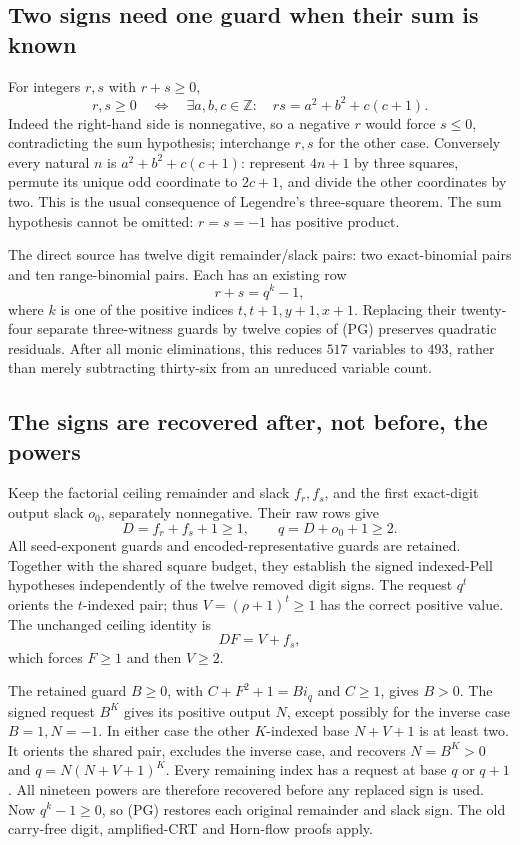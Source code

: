 \subsection{Two signs need one guard when their sum is known}
For integers $r,s$ with $r+s\ge0$,
\[
 r,s\ge0\quad\Longleftrightarrow\quad
 \exists a,b,c\in\mathbb Z:\quad rs=a^2+b^2+c(c+1).       \tag{PG}
\]
Indeed the right-hand side is nonnegative, so a negative $r$ would force
$s\le0$, contradicting the sum hypothesis; interchange $r,s$ for the
other case. Conversely every natural $n$ is $a^2+b^2+c(c+1)$: represent
$4n+1$ by three squares, permute its unique odd coordinate to $2c+1$,
and divide the other coordinates by two. This is the usual consequence
of Legendre's three-square theorem. The sum hypothesis cannot be omitted:
$r=s=-1$ has positive product.

The direct source has twelve digit remainder/slack pairs: two exact-binomial
pairs and ten range-binomial pairs. Each has an existing row
\[
 r+s=q^k-1,
\]
where $k$ is one of the positive indices $t,t+1,y+1,x+1$.
Replacing their twenty-four separate three-witness guards by twelve copies
of (PG) preserves quadratic residuals. After all monic eliminations, this
reduces $517$ variables to $493$, rather than merely subtracting thirty-six
from an unreduced variable count.

\subsection{The signs are recovered after, not before, the powers}
Keep the factorial ceiling remainder and slack $f_r,f_s$, and the first
exact-digit output slack $o_0$, separately nonnegative. Their raw rows give
\[
 D=f_r+f_s+1\ge1,\qquad q=D+o_0+1\ge2.                 \tag{B1}
\]
All seed-exponent guards and encoded-representative guards are retained.
Together with the shared square budget, they establish the signed
indexed-Pell hypotheses independently of the twelve removed digit signs.
The request $q^t$ orients the $t$-indexed pair; thus
$V=(\rho+1)^t\ge1$ has the correct positive value. The unchanged ceiling
identity is
\[
 DF=V+f_s,                                                \tag{B2}
\]
which forces $F\ge1$ and then $V\ge2$.

The retained guard $B\ge0$, with $C+F^2+1=B i_q$ and $C\ge1$, gives
$B>0$. The signed request $B^K$ gives its positive output $N$, except
possibly for the inverse case $B=1,N=-1$. In either case the other
$K$-indexed base $N+V+1$ is at least two. It orients the shared pair,
excludes the inverse case, and recovers $N=B^K>0$ and
$q=N(N+V+1)^K$. Every remaining index has a request at base $q$ or $q+1$.
All nineteen powers are therefore recovered before any replaced sign is
used. Now $q^k-1\ge0$, so (PG) restores each original remainder and slack
sign. The old carry-free digit, amplified-CRT and Horn-flow proofs apply.

